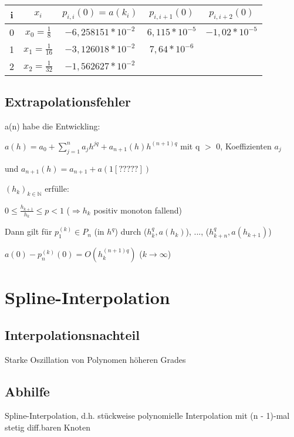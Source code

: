 \documentclass[12pt,a4paper]{article} %
\newcommand*\tab[1][1cm]{\hspace*{#1}}
\begin{document}
	\begin{tabular}{ c | c | c | c | c }
		i & $x_i$ & $p_{i, i}(0) = a(k_i)$ & $p_{i, i + 1}(0)$ & $p_{i, i + 2}(0)$ \\ \hline
		0 & $x_0 = \frac{1}{8}$ & $-6,258151 * 10^{-2}$ & $6,115 * 10^{-5}$ & $-1,02 * 10^{-5}$ \\
		1 & $x_1 = \frac{1}{16}$ & $-3,126018 * 10^{-2}$ & $7,64 * 10^{-6}$ & \\
		2 & $x_2 = \frac{1}{32}$ & $-1,562627 * 10^{-2}$ & & 
	\end{tabular}

	\subsection{Extrapolationsfehler}
	
	a(n) habe die Entwickling:
	
	$a(h) = a_0 + \sum\limits_{j = 1}^{n}a_jh^{jq} + a_{n + 1}(h)h^{(n+1)q}$ \tab mit q $>$ 0,
	 Koeffizienten $a_j$ 
	 
	und $a_{n + 1}(h) = a_{n + 1} + a(1[?????])$
	
	$(h_k)_{k \in \mathbb{N}}$ erfülle:
	
	$0 \le \frac{h_{k + 1}}{h_k} \le p < 1$ ($\Rightarrow h_k$ positiv monoton fallend)
	
	Dann gilt für $p_1^{(k)} \in P_n$ (in $h^q$) durch ($h_k^q, a(h_k)$), ..., ($h_{k +n}^q, a(h_{k + 1})$)
	
	$a(0) - p_n^{(k)}(0) = O(h_k^{(n + 1)q})$ \tab ($k \rightarrow \infty$)
	
	\newpage
	
	\section{Spline-Interpolation}
	
	\subsection{Interpolationsnachteil}
	
	Starke Oszillation von Polynomen höheren Grades
	
	\subsection{Abhilfe}
	
	Spline-Interpolation, d.h. stückweise polynomielle Interpolation mit (n - 1)-mal stetig diff.baren Knoten
	
\end{document}
